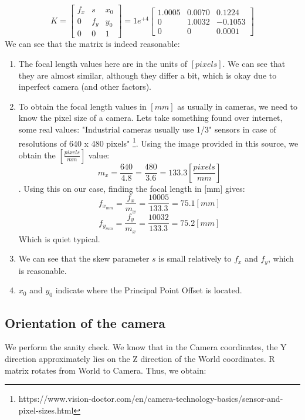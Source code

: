 \documentclass[a4paper]{iacas}
\begin{document}
\begin{equation*}
K = 
\left[
\begin{matrix}
f_{x} & s &  x_{0}\\
0 & f_{y} & y_{0} \\
0 & 0 & 1
\end{matrix}
\right]
=
1e^{+4}
\left[
\begin{matrix}
    1.0005&    0.0070&    0.1224 \\
         0&    1.0032&   -0.1053 \\
         0&         0&    0.0001
\end{matrix}
\right]
\end{equation*}
We can see that the matrix is indeed reasonable:


\begin{enumerate}
\item The focal length values here are in the units of $[pixels]$. We can see that they are almost similar, although they differ a bit, which is okay due to inperfect camera (and other factors).
\item To obtain the focal length values in $[mm]$ as usually in cameras, we need to know the pixel size of a camera. Lets take something found over internet, some real values: "Industrial cameras usually use 1/3" sensors in case of resolutions of 640 x 480 pixels" \footnote{https://www.vision-doctor.com/en/camera-technology-basics/sensor-and-pixel-sizes.html}. Using the image provided in this source, we obtain the $[\frac{pixels}{mm}]$ value: $$m_{x} = \frac{640}{4.8} = \frac{480}{3.6} = 133.3 [\frac{pixels}{mm}]$$.
Using this on our case, finding the focal length in [mm] gives:
$$f_{x_{mm}} = \frac{f_{x}}{m_{x}} = \frac{10005}{133.3} = 75.1 [mm]$$
$$f_{y_{mm}} = \frac{f_{y}}{m_{x}} = \frac{10032}{133.3} = 75.2 [mm]$$
Which is quiet typical. 
\item We can see that the skew parameter $s$ is small relatively to $f_{x}$ and $f_{y}$, which is reasonable.
\item $x_{0}$ and $y_{0}$ indicate where the Principal Point Offset is located.
\end{enumerate}

\subsection{Orientation of the camera}
We perform the sanity check. We know that in the Camera coordinates, the Y direction approximately lies on the Z direction of the World coordinates. R matrix rotates from World to Camera. Thus, we obtain:
\end{document}
